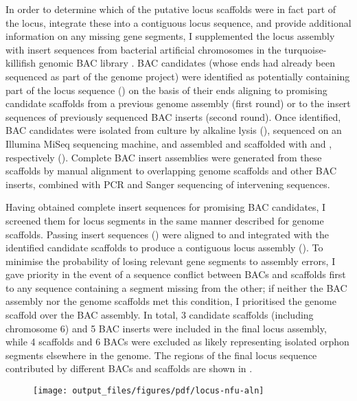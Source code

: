 In order to determine which of the putative locus scaffolds were in fact part of the \igh{} locus, integrate these into a contiguous locus sequence, and provide additional information on any missing gene segments, I supplemented the locus assembly with insert sequences from bacterial artificial chromosomes in the turquoise-killifish genomic BAC library \parencite{reichwald2015genome}. BAC candidates (whose ends had already been sequenced as part of the genome project) were identified as potentially containing part of the locus sequence () on the basis of their ends aligning to promising candidate scaffolds from a previous genome assembly (first round) or to the insert sequences of previously sequenced BAC inserts (second round). Once identified,  BAC candidates were isolated from culture by alkaline lysis (), sequenced on an Illumina MiSeq sequencing machine, and assembled and scaffolded with  and , respectively (). Complete BAC insert assemblies were generated from these scaffolds by manual alignment to overlapping genome scaffolds and other BAC inserts, combined with PCR and Sanger sequencing of intervening sequences.

Having obtained complete insert sequences for promising BAC candidates, I screened them for \igh{} locus segments in the same manner described for genome scaffolds. Passing insert sequences () were aligned to and integrated with the identified candidate scaffolds to produce a contiguous locus assembly (). To minimise the probability of losing relevant gene segments to assembly errors, I gave priority in the event of a sequence conflict between BACs and scaffolds first to any sequence containing a segment missing from the other; if neither the BAC assembly nor the genome scaffolds met this condition, I prioritised the genome scaffold over the BAC assembly. In total, 3 candidate scaffolds (including chromosome 6) and 5 BAC inserts were included in the final locus assembly, while 4 scaffolds and 6 BACs were excluded as likely representing isolated \igh{} orphon segments elsewhere in the genome. The regions of the final locus sequence contributed by different BACs and scaffolds are shown in .

\begin{figure}
\centering
\texttt{[image: output\_files/figures/pdf/locus-nfu-aln]}
\label{fig:nfu-locus-aln}
\end{figure}

